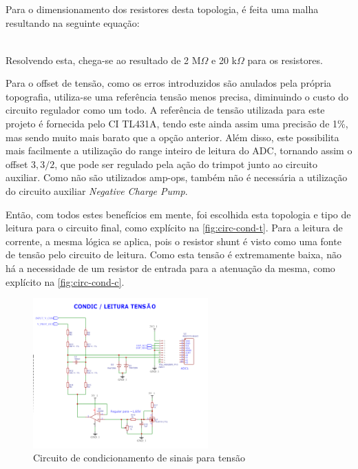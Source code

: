 Para o dimensionamento dos resistores desta topologia, é feita uma malha resultando na seguinte equação:

\begin{equation}
    \label{eq03}
    \begin{array}{lcl}
    \end{array}
\end{equation}

Resolvendo esta, chega-se ao resultado de 2 M$\Omega$ e 20 k$\Omega$ para os resistores.

Para o offset de tensão, como os erros introduzidos são anulados pela própria topografia, utiliza-se uma referência tensão menos precisa, diminuindo o custo do circuito regulador como um todo. A referência de tensão utilizada para este projeto é fornecida pelo \gls{CI} TL431A, tendo este ainda assim uma precisão de 1\%, mas sendo muito mais barato que a opção anterior. Além disso, este possibilita mais facilmente a utilização do range inteiro de leitura do \gls{ADC}, tornando assim o offset $3,3/2$, que pode ser regulado pela ação do trimpot junto ao circuito auxiliar. Como não são utilizados \gls{amp-op}s, também não é necessária a utilização do circuito auxiliar \textit{Negative Charge Pump}.

Então, com todos estes benefícios em mente, foi escolhida esta topologia e tipo de leitura para o circuito final, como explícito na \autoref{fig:circ-cond-t}. Para a leitura de corrente, a mesma lógica se aplica, pois o resistor shunt é visto como uma fonte de tensão pelo circuito de leitura. Como esta tensão é extremamente baixa, não há a necessidade de um resistor de entrada para a atenuação da mesma, como explícito na \autoref{fig:circ-cond-c}.

\begin{figure}[htb!]
    \caption{Circuito de condicionamento de sinais para tensão}
    \label{fig:circ-cond-t}
    \includegraphics[width=0.6\textwidth]{figuras/circ-cond-t.png}
    \fonte{}
\end{figure}

